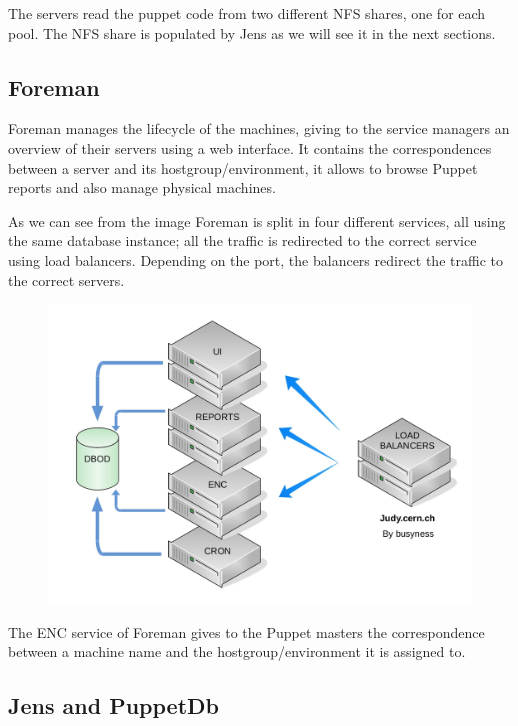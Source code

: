 The servers read the puppet code from two different NFS shares, one for
each pool. The NFS share is populated by Jens as we will see it in the
next sections.

\subsection{Foreman}

Foreman manages the lifecycle of the machines, giving to the service
managers an overview of their servers using a web interface. It contains
the correspondences between a server and its hostgroup/environment, it
allows to browse Puppet reports and also manage physical machines.

As we can see from the image Foreman is split in four different services,
all using the same database instance; all the traffic is redirected to the
correct service using load balancers. Depending on the port, the balancers
redirect the traffic to the correct servers.

\begin{figure}[H]
\includegraphics[width=\textwidth,height=\textheight,keepaspectratio]{ConfigurationManagement/Infrastructure_judy.jpg}
\end{figure}

The ENC service of Foreman gives to the Puppet masters the correspondence
between a machine name and the hostgroup/environment it is assigned to.


\subsection{Jens and PuppetDb}

